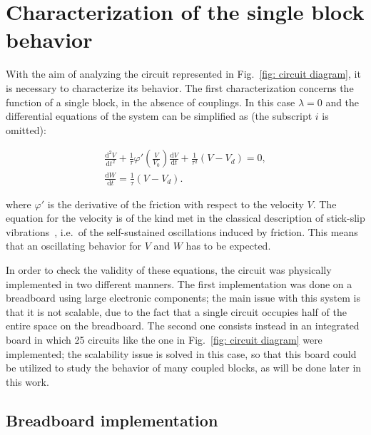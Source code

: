 \section{Characterization of the single block behavior}\label{sec: single block characterization}

With the aim of analyzing the circuit represented in Fig.~\ref{fig: circuit diagram},
it is necessary to characterize its behavior. The first characterization concerns the
function of a single block, in the absence of couplings.
In this case $\lambda=0$ and the differential equations of the system can be simplified as
(the subscript $i$ is omitted):

\begin{equation}
\label{eq: single block eq motion}
\begin{gathered}
    \frac{\text{d}^2V}{\text{d}t^2}+
    \frac{1}{\tau}\varphi'\left(\frac{V}{V_0}\right)\frac{\text{d}V}{\text{d}t}+
    \frac{1}{\tau^2}(V-V_d)=0,\\[10pt]
    \frac{\text{d}W}{\text{d}t}=\frac{1}{\tau}(V-V_d).
\end{gathered}
\end{equation}

where $\varphi'$ is the derivative of the friction with respect to the velocity $V$.
The equation for the velocity is of the kind met in the classical description of stick-slip
vibrations~\cite{ref:stick_slip}, i.e.\ of the self-sustained oscillations induced by friction.
This means that an oscillating behavior for $V$ and $W$ has to be expected.

In order to check the validity of these equations, the circuit was physically implemented
in two different manners. The first implementation was done on a breadboard using large
electronic components; the main issue with this system is that it is not scalable,
due to the fact that a single circuit occupies half of the entire space on the breadboard.
The second one consists instead in an integrated board in which 25 circuits
like the one in Fig.~\ref{fig: circuit diagram} were implemented;
the scalability issue is solved in this case, so that this board could be utilized
to study the behavior of many coupled blocks, as will be done later in this work.

\subsection{Breadboard implementation}\label{subsec:breadboard implementation}

